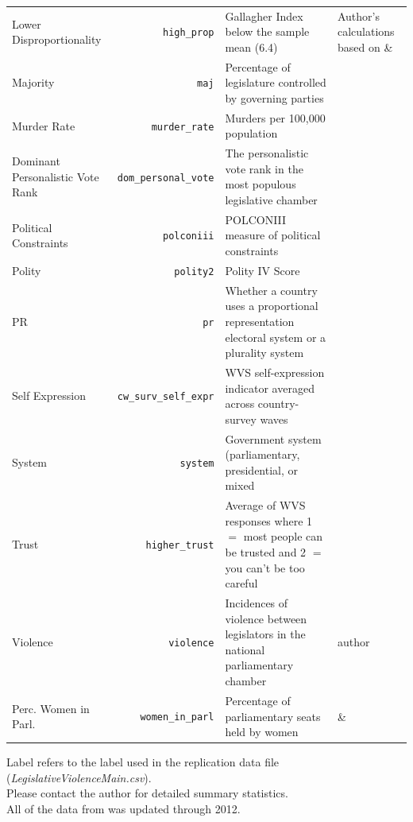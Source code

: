\documentclass[a4paper]{article}\usepackage[]{graphicx}\usepackage[]{color}
\begin{document}
\begin{table}[H]
\begin{center}
\begin{tabular}{m{2cm} r m{6cm} m{3.5cm}}
            Lower Disproportionality & \verb|high_prop| & Gallagher Index below the sample mean (6.4) & Author's calculations based on \cite{Gallagher2012} \& \cite{Carey2011}\\
            Majority & \texttt{maj} & Percentage of legislature controlled by governing parties & \cite{DPI2001} \\
            Murder Rate & \verb|murder_rate| & Murders per 100,000 population & \cite{UNMurder2013} \\
            Dominant Personalistic Vote Rank & \verb|dom_personal_vote| & The personalistic vote rank in the most populous legislative chamber & \citep{johnson2012} \\
            Political Constraints & \texttt{polconiii} & POLCONIII measure of political constraints & \cite[][updated through 2011]{Henisz2004} \\
            Polity & \texttt{polity2} & Polity IV Score & \cite{Marshall2009} \\
            PR & \texttt{pr} & Whether a country uses a proportional representation electoral system or a plurality system & \cite{DPI2001} \\
            Self Expression & \verb|cw_surv_self_expr| & WVS self-expression indicator averaged across country-survey waves & \cite{WVS2009} \\
            System & \texttt{system} & Government system (parliamentary, presidential, or mixed & \cite{DPI2001} \\
            Trust & \verb|higher_trust| & Average of WVS responses where 1 $=$ most people can be trusted and 2 $=$ you can't be too careful & \cite{WVS2009} \\
            Violence & \texttt{violence} & Incidences of violence between legislators in the national parliamentary chamber & author \\
            Perc. Women in Parl. & \verb|women_in_parl| & Percentage of parliamentary seats held by women & \cite{WomParCrossNat} \& \cite{IPU2013} \\
            \hline

    \end{tabular}
    \end{center}
    \begin{singlespace}
        Label refers to the label used in the replication data file (\emph{LegislativeViolenceMain.csv}). \\
        Please contact the author for detailed summary statistics. \\
        All of the data from \cite{DPI2001} was updated through 2012.
    \end{singlespace}

\end{table}
\end{document}
